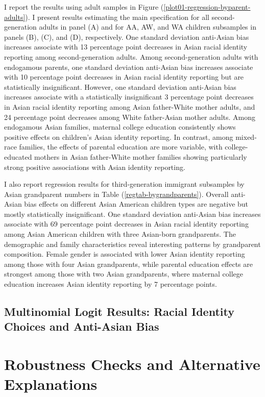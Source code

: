 I report the results using adult samples in Figure (\ref{plot01-regression-byparent-adults}). I present results estimating the main specification for all second-generation adults in panel (A) and for AA, AW, and WA children subsamples in panels (B), (C), and (D), respectively. One standard deviation anti-Asian bias increases associate with 13 percentage point decreases in Asian racial identity reporting among second-generation adults. Among second-generation adults with endogamous parents, one standard deviation anti-Asian bias increases associate with 10 percentage point decreases in Asian racial identity reporting but are statistically insignificant. However, one standard deviation anti-Asian bias increases associate with a statistically insignificant 3 percentage point decreases in Asian racial identity reporting among Asian father-White mother adults, and 24 percentage point decreases among White father-Asian mother adults. Among endogamous Asian families, maternal college education consistently shows positive effects on children's Asian identity reporting. In contrast, among mixed-race families, the effects of parental education are more variable, with college-educated mothers in Asian father-White mother families showing particularly strong positive associations with Asian identity reporting.

I also report regression results for third-generation immigrant subsamples by Asian grandparent numbers in Table (\ref{regtab-bygrandparents}). Overall anti-Asian bias effects on different Asian American children types are negative but mostly statistically insignificant. One standard deviation anti-Asian bias increases associate with 69 percentage point decreases in Asian racial identity reporting among Asian American children with three Asian-born grandparents. The demographic and family characteristics reveal interesting patterns by grandparent composition. Female gender is associated with lower Asian identity reporting among those with four Asian grandparents, while parental education effects are strongest among those with two Asian grandparents, where maternal college education increases Asian identity reporting by 7 percentage points.

\subsection*{Multinomial Logit Results: Racial Identity Choices and Anti-Asian Bias}


\section{Robustness Checks and Alternative Explanations}\label{sec:robcheck}

